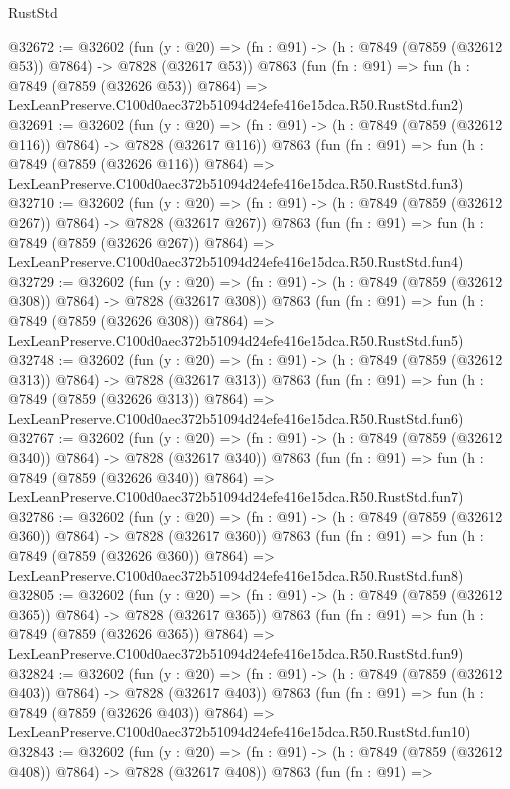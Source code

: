 \begin{lexlean}{RustStd}
\begin{coremodule}
@32672 := @32602
    (fun (y : @20) => (fn : @91) -> (h : @7849 (@7859 (@32612 @53)) @7864) -> @7828 (@32617 @53))
    @7863
    (fun (fn : @91) =>
    fun (h : @7849 (@7859 (@32626 @53)) @7864) =>
    LexLeanPreserve.C100d0aec372b51094d24efe416e15dca.R50.RustStd.fun2)
@32691 := @32602
    (fun (y : @20) => (fn : @91) -> (h : @7849 (@7859 (@32612 @116)) @7864) -> @7828 (@32617 @116))
    @7863
    (fun (fn : @91) =>
    fun (h : @7849 (@7859 (@32626 @116)) @7864) =>
    LexLeanPreserve.C100d0aec372b51094d24efe416e15dca.R50.RustStd.fun3)
@32710 := @32602
    (fun (y : @20) => (fn : @91) -> (h : @7849 (@7859 (@32612 @267)) @7864) -> @7828 (@32617 @267))
    @7863
    (fun (fn : @91) =>
    fun (h : @7849 (@7859 (@32626 @267)) @7864) =>
    LexLeanPreserve.C100d0aec372b51094d24efe416e15dca.R50.RustStd.fun4)
@32729 := @32602
    (fun (y : @20) => (fn : @91) -> (h : @7849 (@7859 (@32612 @308)) @7864) -> @7828 (@32617 @308))
    @7863
    (fun (fn : @91) =>
    fun (h : @7849 (@7859 (@32626 @308)) @7864) =>
    LexLeanPreserve.C100d0aec372b51094d24efe416e15dca.R50.RustStd.fun5)
@32748 := @32602
    (fun (y : @20) => (fn : @91) -> (h : @7849 (@7859 (@32612 @313)) @7864) -> @7828 (@32617 @313))
    @7863
    (fun (fn : @91) =>
    fun (h : @7849 (@7859 (@32626 @313)) @7864) =>
    LexLeanPreserve.C100d0aec372b51094d24efe416e15dca.R50.RustStd.fun6)
@32767 := @32602
    (fun (y : @20) => (fn : @91) -> (h : @7849 (@7859 (@32612 @340)) @7864) -> @7828 (@32617 @340))
    @7863
    (fun (fn : @91) =>
    fun (h : @7849 (@7859 (@32626 @340)) @7864) =>
    LexLeanPreserve.C100d0aec372b51094d24efe416e15dca.R50.RustStd.fun7)
@32786 := @32602
    (fun (y : @20) => (fn : @91) -> (h : @7849 (@7859 (@32612 @360)) @7864) -> @7828 (@32617 @360))
    @7863
    (fun (fn : @91) =>
    fun (h : @7849 (@7859 (@32626 @360)) @7864) =>
    LexLeanPreserve.C100d0aec372b51094d24efe416e15dca.R50.RustStd.fun8)
@32805 := @32602
    (fun (y : @20) => (fn : @91) -> (h : @7849 (@7859 (@32612 @365)) @7864) -> @7828 (@32617 @365))
    @7863
    (fun (fn : @91) =>
    fun (h : @7849 (@7859 (@32626 @365)) @7864) =>
    LexLeanPreserve.C100d0aec372b51094d24efe416e15dca.R50.RustStd.fun9)
@32824 := @32602
    (fun (y : @20) => (fn : @91) -> (h : @7849 (@7859 (@32612 @403)) @7864) -> @7828 (@32617 @403))
    @7863
    (fun (fn : @91) =>
    fun (h : @7849 (@7859 (@32626 @403)) @7864) =>
    LexLeanPreserve.C100d0aec372b51094d24efe416e15dca.R50.RustStd.fun10)
@32843 := @32602
    (fun (y : @20) => (fn : @91) -> (h : @7849 (@7859 (@32612 @408)) @7864) -> @7828 (@32617 @408))
    @7863
    (fun (fn : @91) =>

\end{coremodule}
\end{lexlean}
